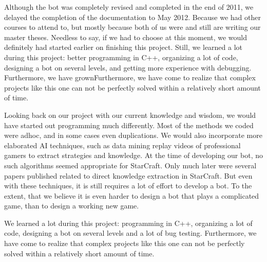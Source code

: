 Although the bot was completely revised and completed in the end of 2011, we delayed the completion of the documentation to May 2012. Because we had other courses to attend to, but mostly because both of us were and still are writing our master theses. Needless to say, if we had to choose at this moment, we would definitely had started earlier on finishing this project. Still, we learned a lot during this project: better programming in C++, organizing a lot of code, designing a bot on several levels, and getting more experience with debugging. Furthermore, we have grownFurthermore, we have come to realize that complex projects like this one can not be perfectly solved within a relatively short amount of time.

Looking back on our project with our current knowledge and wisdom, we would have started out programming much differently. Most of the methods we coded were adhoc, and in some cases even duplications. We would also incorporate more elaborated AI techniques, such as data mining replay videos of professional gamers to extract strategies and knowledge. At the time of developing our bot, no such algorithms seemed appropriate for StarCraft. Only much later were several papers published related to direct knowledge extraction in StarCraft. But even with these techniques, it is still requires a lot of effort to develop a bot. To the extent, that we believe it is even harder to design a bot that plays a complicated game, than to design a working new game.

We learned a lot during this project: programming in C++, organizing a lot of code, designing a bot on several levels and a lot of bug testing. Furthermore, we have come to realize that complex projects like this one can not be perfectly solved within a relatively short amount of time.







%
